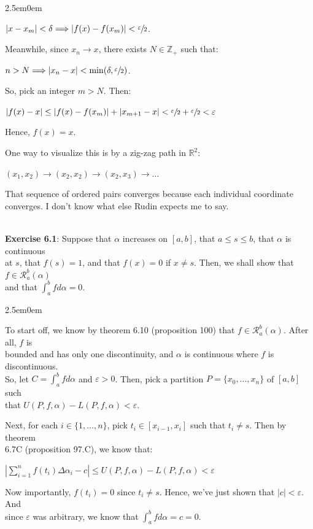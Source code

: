 \documentclass{book}
\newcommand{\pracTwo}{
   \color{Orange}%
   \fontsize{12}{14}\selectfont%
}
\newenvironment{myIndent}{%
   \begin{adjustwidth}{2.5em}{0em}%
}{%
   \end{adjustwidth}%
}
\newcommand{\mySepTwo}[1][.]{%
   {\noindent\color{#1}{\rule{6.5in}{0.5mm}}}\\%
}
\newcommand{\retTwo}{\hfill\bigbreak}
\begin{document}
{\begin{myIndent}
   {\centering $|x - x_m| < \delta \Longrightarrow |f(x) - f(x_m)| < \sfrac{\varepsilon}{2}$.\retTwo\par}

   Meanwhile, since $x_n \rightarrow x$, there exists $N \in \mathbb{Z}_+$ such that:
   
   {\centering$n > N \Longrightarrow |x_n - x| < \min(\delta, \sfrac{\varepsilon}{2})$.\retTwo\par}

   So, pick an integer $m > N$. Then: 
   
   {\center$|f(x) - x| \leq |f(x) - f(x_m)| + |x_{m+1} - x| < \sfrac{\varepsilon}{2} + \sfrac{\varepsilon}{2} < \varepsilon$\retTwo\par}

   Hence, $f(x) = x$.\retTwo
\end{myIndent}}

One way to visualize this is by a zig-zag path in $\mathbb{R}^2$:

{\centering $(x_1, x_2)\rightarrow (x_2, x_2)\rightarrow(x_2, x_3)\rightarrow \ldots$ \retTwo\par}

That sequence of ordered pairs converges because each individual coordinate\\ converges. I don't know what else Rudin expects me to say.\retTwo

\mySepTwo[Black]

\textbf{Exercise 6.1}: Suppose that $\alpha$ increases on $[a, b]$, that $a \leq s \leq b$, that $\alpha$ is continuous\\ at $s$, that $f(s) = 1$, and that $f(x) = 0$ if $x \neq s$. Then, we shall show that $f \in \mathscr{R}_a^b(\alpha)$\\ and that $\int_a^b fd\alpha = 0$.\\[-6pt]

{\begin{myIndent}\pracTwo
   To start off, we know by theorem 6.10 (proposition 100) that $f \in \mathscr{R}_a^b(\alpha)$. After all, $f$ is\\ bounded and has only one discontinuity, and $\alpha$ is continuous where $f$ is discontinuous.\\ So, let $C = \int_a^b fd\alpha$ and $\varepsilon > 0$. Then, pick a partition $P = \{x_0, \ldots, x_n\}$ of $[a, b]$ such\\ that $U(P, f, \alpha) - L(P, f, \alpha) < \varepsilon$.\retTwo

   Next, for each $i \in \{1, \ldots, n\}$, pick $t_i \in [x_{i-1}, x_i]$ such that $t_i \neq s$. Then by theorem\\ 6.7C (proposition 97.C), we know that:
   
   {\centering$\left|\sum\limits_{i=1}^nf(t_i)\Delta\alpha_i - c\right| \leq U(P, f, \alpha) - L(P, f, \alpha) < \varepsilon$\retTwo\par}

   Now importantly, $f(t_i) = 0$ since $t_i \neq s$. Hence, we've just shown that $|c| < \varepsilon$. And\\ since $\varepsilon$ was arbitrary, we know that $\int_a^b fd\alpha = c = 0$.\retTwo
\end{myIndent}}
\end{document}
